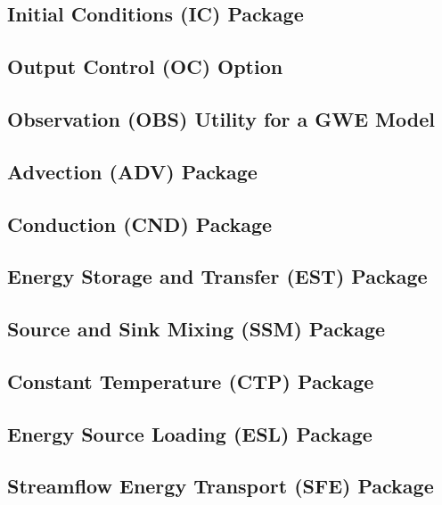 \newpage
\subsection{Initial Conditions (IC) Package}


\newpage
\subsection{Output Control (OC) Option}


\newpage
\subsection{Observation (OBS) Utility for a GWE Model}


\newpage
\subsection{Advection (ADV) Package}


\newpage
\subsection{Conduction (CND) Package}


\newpage
\subsection{Energy Storage and Transfer (EST) Package}


\newpage
\subsection{Source and Sink Mixing (SSM) Package}


\newpage
\subsection{Constant Temperature (CTP) Package}


\newpage
\subsection{Energy Source Loading (ESL) Package}


\newpage
\subsection{Streamflow Energy Transport (SFE) Package}


